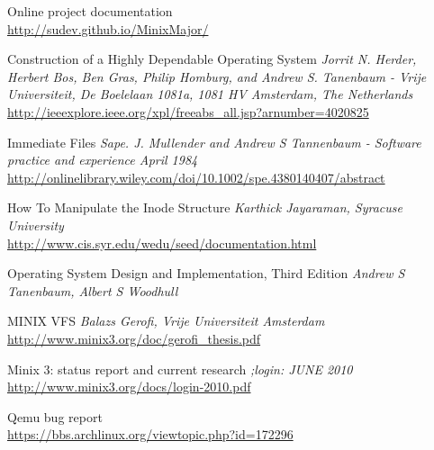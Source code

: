 \cleardoublepage
{}
{}
\begin{thebibliography}{99}

 Online project documentation \\ \url{http://sudev.github.io/MinixMajor/}

 Construction of a Highly Dependable Operating System { \em Jorrit N. Herder, Herbert Bos, Ben Gras, Philip Homburg, and Andrew S. Tanenbaum - Vrije Universiteit, De Boelelaan 1081a, 1081 HV Amsterdam, The Netherlands } \\ \url{http://ieeexplore.ieee.org/xpl/freeabs_all.jsp?arnumber=4020825}

Immediate Files {\em Sape. J. Mullender and Andrew S Tannenbaum - Software practice and experience April 1984 } \\  \url{http://onlinelibrary.wiley.com/doi/10.1002/spe.4380140407/abstract}

 How To Manipulate the Inode Structure  {\em Karthick Jayaraman, Syracuse University } \\ \url {http://www.cis.syr.edu/wedu/seed/documentation.html}

 Operating System Design and Implementation, Third Edition{ \em Andrew S Tanenbaum, Albert S Woodhull }

 MINIX VFS {\em Balazs Gerofi, Vrije Universiteit Amsterdam } \\ \url {http://www.minix3.org/doc/gerofi_thesis.pdf}

 Minix 3: status report and current research { \em ;login: JUNE 2010 } \\
 \url{http://www.minix3.org/docs/login-2010.pdf}

 Qemu bug report   \\
 \url{https://bbs.archlinux.org/viewtopic.php?id=172296}


\end{thebibliography}
